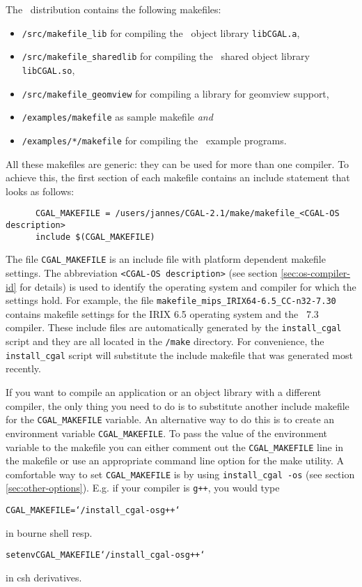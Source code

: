 The \cgal\ distribution contains the following makefiles:
\begin{itemize}
\item \texttt{\cgaldir/src/makefile\_lib} for compiling the \cgal\ 
  object library \texttt{libCGAL.a},
  
\item \texttt{\cgaldir/src/makefile\_sharedlib} for compiling the
  \cgal\ shared object library \texttt{libCGAL.so},
  
\item \texttt{\cgaldir/src/makefile\_geomview} for compiling a library
  for geomview support,
  
\item \texttt{\cgaldir/examples/makefile} as sample makefile
  \textit{and}
  
\item \texttt{\cgaldir/examples/*/makefile} for compiling the \cgal\ 
  example programs.
\end{itemize}

All these makefiles are generic: they can be used for more than one
compiler.  To achieve this, the first section of each makefile
contains an include statement that looks as follows:

\begin{verbatim}
      CGAL_MAKEFILE = /users/jannes/CGAL-2.1/make/makefile_<CGAL-OS description>
      include $(CGAL_MAKEFILE)
\end{verbatim}

The file \texttt{CGAL\_MAKEFILE} is an include file with platform
dependent makefile settings. The abbreviation \texttt{<CGAL-OS
  description>} (see section \ref{sec:os-compiler-id} for details) is
used to identify the operating system and compiler for which the
settings hold. For example, the file
\texttt{makefile\_mips\_IRIX64-6.5\_CC-n32-7.30} contains makefile
settings for the IRIX 6.5 operating system and the \mipsprocc\ 7.3
compiler.  These include files are automatically generated by the
\texttt{install\_cgal} script and they are all located in the
\texttt{\cgaldir/make} directory.  For convenience, the
\texttt{install\_cgal} script will substitute the include makefile
that was generated most recently.

If you want to compile an application or an object library with a
different compiler, the only thing you need to do is to substitute
another include makefile for the \texttt{CGAL\_MAKEFILE} variable. An
alternative way to do this is to create an environment variable
\texttt{CGAL\_MAKEFILE}. To pass the value of the environment variable
to the makefile you can either comment out the \texttt{CGAL\_MAKEFILE}
line in the makefile or use an appropriate command line option for the
make utility.  A comfortable way to set \texttt{CGAL\_MAKEFILE} is by
using \texttt{install\_cgal~-os} (see section
\ref{sec:other-options}).  E.g. if your compiler is \texttt{g++}, you
would type
\begin{alltt}
CGAL_MAKEFILE=`\yourcgaldir/install_cgal -os g++`
\end{alltt}
in bourne shell resp.
\begin{alltt}
setenv CGAL_MAKEFILE `\yourcgaldir/install_cgal -os g++`
\end{alltt}
in csh derivatives. 

